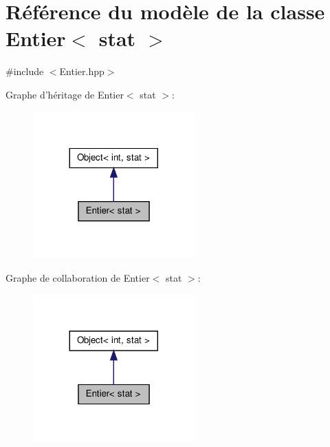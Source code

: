 \hypertarget{class_entier}{\section{Référence du modèle de la classe Entier$<$ stat $>$}
\label{class_entier}
}


{\ttfamily \#include $<$Entier.\-hpp$>$}



Graphe d'héritage de Entier$<$ stat $>$\-:\nopagebreak
\begin{figure}[H]
\begin{center}
\leavevmode
\includegraphics[width=176pt]{class_entier__inherit__graph}
\end{center}
\end{figure}


Graphe de collaboration de Entier$<$ stat $>$\-:\nopagebreak
\begin{figure}[H]
\begin{center}
\leavevmode
\includegraphics[width=176pt]{class_entier__coll__graph}
\end{center}
\end{figure}
